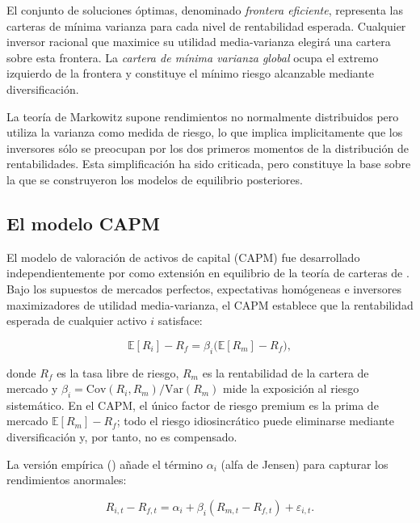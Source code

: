 \documentclass[12pt, a4paper]{article}
\begin{document}
El conjunto de soluciones \'optimas, denominado \textit{frontera eficiente}, representa
las carteras de m\'inima varianza para cada nivel de rentabilidad esperada. Cualquier
inversor racional que maximice su utilidad media-varianza elegir\'a una cartera sobre
esta frontera. La \textit{cartera de m\'inima varianza global} ocupa el extremo izquierdo
de la frontera y constituye el m\'inimo riesgo alcanzable mediante diversificaci\'on.

La teor\'ia de Markowitz supone rendimientos no normalmente distribuidos pero utiliza
la varianza como medida de riesgo, lo que implica implicitamente que los inversores
s\'olo se preocupan por los dos primeros momentos de la distribuci\'on de rentabilidades.
Esta simplificaci\'on ha sido criticada, pero constituye la base sobre la que se
construyeron los modelos de equilibrio posteriores.

\subsection{El modelo CAPM}
\label{subsec:capm}

El modelo de valoraci\'on de activos de capital (CAPM) fue desarrollado
independientemente por \textcites{sharpe1964}{lintner1965}{mossin1966} como extensi\'on
en equilibrio de la teor\'ia de carteras de \textcite{markowitz1952}. Bajo los supuestos
de mercados perfectos, expectativas hom\'ogeneas e inversores maximizadores de utilidad
media-varianza, el CAPM establece que la rentabilidad esperada de cualquier activo $i$
satisface:

\begin{equation}
  \label{eq:capm}
  \mathbb{E}[R_i] - R_f = \beta_i \bigl(\mathbb{E}[R_m] - R_f\bigr),
\end{equation}

donde $R_f$ es la tasa libre de riesgo, $R_m$ es la rentabilidad de la cartera de
mercado y $\beta_i = \mathrm{Cov}(R_i, R_m)/\mathrm{Var}(R_m)$ mide la exposici\'on
al riesgo sistem\'atico. En el CAPM, el \'unico factor de riesgo premium es la prima
de mercado $\mathbb{E}[R_m]-R_f$; todo el riesgo idiosincr\'atico puede eliminarse
mediante diversificaci\'on y, por tanto, no es compensado.

La versi\'on emp\'irica (\cite{jensen1968}) a\~nade el t\'ermino $\alpha_i$
(alfa de Jensen) para capturar los rendimientos anormales:

\begin{equation}
  \label{eq:capm_ts}
  R_{i,t} - R_{f,t} = \alpha_i + \beta_i(R_{m,t} - R_{f,t}) + \varepsilon_{i,t}.
\end{equation}
\end{document}
